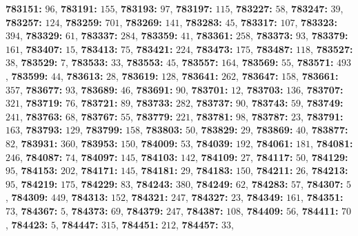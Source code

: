 \textsf{\bfseries 783151:} $96$, \textsf{\bfseries 783191:} $155$, \textsf{\bfseries 783193:} $97$, \textsf{\bfseries 783197:} $115$, \textsf{\bfseries 783227:} $58$, \textsf{\bfseries 783247:} $39$, \textsf{\bfseries 783257:} $124$, \textsf{\bfseries 783259:} $701$, \textsf{\bfseries 783269:} $141$, \textsf{\bfseries 783283:} $45$, \textsf{\bfseries 783317:} $107$, \textsf{\bfseries 783323:} $394$, \textsf{\bfseries 783329:} $61$, \textsf{\bfseries 783337:} $284$, \textsf{\bfseries 783359:} $41$, \textsf{\bfseries 783361:} $258$, \textsf{\bfseries 783373:} $93$, \textsf{\bfseries 783379:} $161$, \textsf{\bfseries 783407:} $15$, \textsf{\bfseries 783413:} $75$, \textsf{\bfseries 783421:} $224$, \textsf{\bfseries 783473:} $175$, \textsf{\bfseries 783487:} $118$, \textsf{\bfseries 783527:} $38$, \textsf{\bfseries 783529:} $7$, \textsf{\bfseries 783533:} $33$, \textsf{\bfseries 783553:} $45$, \textsf{\bfseries 783557:} $164$, \textsf{\bfseries 783569:} $55$, \textsf{\bfseries 783571:} $493$, \textsf{\bfseries 783599:} $44$, \textsf{\bfseries 783613:} $28$, \textsf{\bfseries 783619:} $128$, \textsf{\bfseries 783641:} $262$, \textsf{\bfseries 783647:} $158$, \textsf{\bfseries 783661:} $357$, \textsf{\bfseries 783677:} $93$, \textsf{\bfseries 783689:} $46$, \textsf{\bfseries 783691:} $90$, \textsf{\bfseries 783701:} $12$, \textsf{\bfseries 783703:} $136$, \textsf{\bfseries 783707:} $321$, \textsf{\bfseries 783719:} $76$, \textsf{\bfseries 783721:} $89$, \textsf{\bfseries 783733:} $282$, \textsf{\bfseries 783737:} $90$, \textsf{\bfseries 783743:} $59$, \textsf{\bfseries 783749:} $241$, \textsf{\bfseries 783763:} $68$, \textsf{\bfseries 783767:} $55$, \textsf{\bfseries 783779:} $221$, \textsf{\bfseries 783781:} $98$, \textsf{\bfseries 783787:} $23$, \textsf{\bfseries 783791:} $163$, \textsf{\bfseries 783793:} $129$, \textsf{\bfseries 783799:} $158$, \textsf{\bfseries 783803:} $50$, \textsf{\bfseries 783829:} $29$, \textsf{\bfseries 783869:} $40$, \textsf{\bfseries 783877:} $82$, \textsf{\bfseries 783931:} $360$, \textsf{\bfseries 783953:} $150$, \textsf{\bfseries 784009:} $53$, \textsf{\bfseries 784039:} $192$, \textsf{\bfseries 784061:} $181$, \textsf{\bfseries 784081:} $246$, \textsf{\bfseries 784087:} $74$, \textsf{\bfseries 784097:} $145$, \textsf{\bfseries 784103:} $142$, \textsf{\bfseries 784109:} $27$, \textsf{\bfseries 784117:} $50$, \textsf{\bfseries 784129:} $95$, \textsf{\bfseries 784153:} $202$, \textsf{\bfseries 784171:} $145$, \textsf{\bfseries 784181:} $29$, \textsf{\bfseries 784183:} $150$, \textsf{\bfseries 784211:} $26$, \textsf{\bfseries 784213:} $95$, \textsf{\bfseries 784219:} $175$, \textsf{\bfseries 784229:} $83$, \textsf{\bfseries 784243:} $380$, \textsf{\bfseries 784249:} $62$, \textsf{\bfseries 784283:} $57$, \textsf{\bfseries 784307:} $5$, \textsf{\bfseries 784309:} $449$, \textsf{\bfseries 784313:} $152$, \textsf{\bfseries 784321:} $247$, \textsf{\bfseries 784327:} $23$, \textsf{\bfseries 784349:} $161$, \textsf{\bfseries 784351:} $73$, \textsf{\bfseries 784367:} $5$, \textsf{\bfseries 784373:} $69$, \textsf{\bfseries 784379:} $247$, \textsf{\bfseries 784387:} $108$, \textsf{\bfseries 784409:} $56$, \textsf{\bfseries 784411:} $70$, \textsf{\bfseries 784423:} $5$, \textsf{\bfseries 784447:} $315$, \textsf{\bfseries 784451:} $212$, \textsf{\bfseries 784457:} $33$, 
